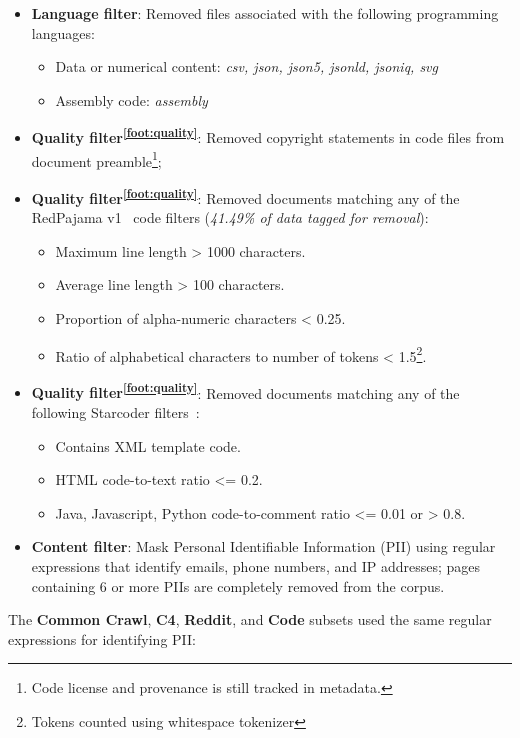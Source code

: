 \documentclass{article}
\newcommand*{\fnref}[1]{\textsuperscript{\ref{#1}}}
\begin{document}
\begin{itemize}[leftmargin=1em]
    \item \textbf{Language filter}: Removed files associated with the following programming languages:
    \begin{itemize}
        \item Data or numerical content: \textit{csv, json, json5, jsonld, jsoniq, svg}
        \item Assembly code: \textit{assembly}
    \end{itemize}
    \item \textbf{Quality filter\fnref{foot:quality}}: Removed copyright statements in code files from document preamble\footnote{Code license and provenance is still tracked in metadata.};
    \item \textbf{Quality filter\fnref{foot:quality}}: Removed documents matching any of the RedPajama v1~\citep{together2023redpajama} code filters (\textit{41.49\% of data tagged for removal}):
    \begin{itemize}
    \item Maximum line length > 1000 characters.
    \item Average line length > 100 characters.
    \item Proportion of alpha-numeric characters < 0.25.
    \item Ratio of alphabetical characters to number of tokens < 1.5\footnote{Tokens counted using whitespace tokenizer}.
    \end{itemize}
    \item \textbf{Quality filter\fnref{foot:quality}}: Removed documents matching any of the following Starcoder filters~\citep{Li2023StarCoderMT}:
    \begin{itemize}
        \item Contains XML template code.
        \item HTML code-to-text ratio <= 0.2.
        \item Java, Javascript, Python code-to-comment ratio <= 0.01 or > 0.8.
    \end{itemize}
    \item  \textbf{Content filter}: Mask Personal Identifiable Information (PII) using regular expressions that identify emails, phone numbers, 
    and IP addresses; pages containing 6 or more PIIs are completely removed from the corpus. 
\end{itemize}

The \textbf{Common Crawl}, \textbf{C4}, \textbf{Reddit}, and \textbf{Code} subsets used the same regular expressions for identifying PII:
\end{document}
